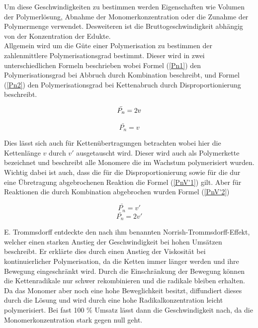 \documentclass[10pt,a4paper,ngerman]{scrartcl}
\begin{document}
	Um diese Geschwindigkeiten zu bestimmen werden Eigenschaften wie Volumen der Polymerlösung, 
	Abnahme der Monomerkonzentration oder die Zunahme der Polymermenge verwendet. 
	Desweiteren ist die Bruttogeschwindigkeit abhängig von der Konzentration der Edukte.\\

	Allgemein wird um die Güte einer Polymerisation zu bestimmen der zahlenmittlere Polymerisationsgrad bestimmt. 
	Dieser wird in zwei unterschiedlichen Formeln beschrieben wobei Formel (\ref{Pn1}) den Polymerisationsgrad bei Abbruch durch Kombination beschreibt, 
	und Formel (\ref{Pn2}) den Polymerisationsgrad bei Kettenabruch durch Disproportionierung beschreibt.

		\begin{equation}
			\bar{P_n} = 2v\\
			\label{Pn1}
		\end{equation}

		\begin{equation}
			\bar{P_n} = v
			\label{Pn2}
		\end{equation}
		
	Dies lässt sich auch für Kettenübertragungen betrachten wobei hier die Kettenlänge $v$ durch $v'$ ausgetauscht wird. 
	Dieser wird auch als Polymerkette bezeichnet und beschreibt alle Monomere die im Wachstum polymerisiert wurden. 
	Wichtig dabei ist auch, dass die für die Disproportionierung sowie für die dur eine Übretragung abgebrochenen Reaktion die Formel (\ref{PnV'1}) gilt.
	Aber für Reaktionen die durch Kombination abgebrochen wurden Formel (\ref{PnV'2})

		\begin{equation}
			\bar{P_n} = v'
			\label{PnV'1}
		\end{equation}
		\begin{equation}
			\bar{P_n} = 2v'
			\label{PnV'2}
		\end{equation}

	E. Trommsdorff entdeckte den nach ihm benannten Norrish-Trommsdorff-Effekt, welcher einen starken Anstieg der Geschwindigkeit bei hohen Umsätzen beschreibt. 
	Er erklärte dies durch einen Anstieg der Viskosität bei kontinuierlicher Polymerisation, 
	da die Ketten immer länger werden und ihre Bewegung eingeschränkt wird. Durch die Einschränkung der Bewegung können die Kettenradikale nur schwer rekombinieren 
	und die radikale bleiben erhalten. Da das Monomer aber noch eine hohe Beweglichkeit besitzt, diffundiert dieses durch die Lösung und wird durch eine hohe 
	Radikalkonzentration leicht polymerisiert. Bei fast 100 \% Umsatz lässt dann die Geschwindigkeit nach, da die Monomerkonzentration stark gegen null geht. \supercite{polyskript}
\end{document}
